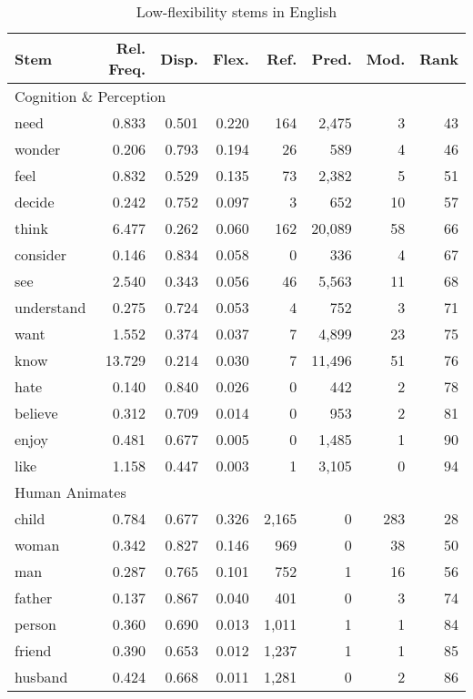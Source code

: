 \begin{table}
  \centering
  \caption{Low-flexibility stems in English}
  \label{tab:English-low-flexibility}
  \begin{tabular}{ l r r r r r r r }
    \toprule
    Stem & Rel. Freq. & Disp. & Flex. & Ref. & Pred. & Mod. & Rank\\

    \midrule
    \multicolumn{6}{l}{Cognition \& Perception}\\
    \midrule
    need       &  0.833 & 0.501 & 0.220 & 164 &  2,475 &  3 & 43\\
    wonder     &  0.206 & 0.793 & 0.194 &  26 &    589 &  4 & 46\\
    feel       &  0.832 & 0.529 & 0.135 &  73 &  2,382 &  5 & 51\\
    decide     &  0.242 & 0.752 & 0.097 &   3 &    652 & 10 & 57\\
    think      &  6.477 & 0.262 & 0.060 & 162 & 20,089 & 58 & 66\\
    consider   &  0.146 & 0.834 & 0.058 &   0 &    336 &  4 & 67\\
    see        &  2.540 & 0.343 & 0.056 &  46 &  5,563 & 11 & 68\\
    understand &  0.275 & 0.724 & 0.053 &   4 &    752 &  3 & 71\\
    want       &  1.552 & 0.374 & 0.037 &   7 &  4,899 & 23 & 75\\
    know       & 13.729 & 0.214 & 0.030 &   7 & 11,496 & 51 & 76\\
    hate       &  0.140 & 0.840 & 0.026 &   0 &    442 &  2 & 78\\
    believe    &  0.312 & 0.709 & 0.014 &   0 &    953 &  2 & 81\\
    enjoy      &  0.481 & 0.677 & 0.005 &   0 &  1,485 &  1 & 90\\
    like       &  1.158 & 0.447 & 0.003 &   1 &  3,105 &  0 & 94\\

    \midrule
    \multicolumn{6}{l}{Human Animates}\\
    \midrule
    child   & 0.784 & 0.677 & 0.326 & 2,165 & 0 & 283 & 28\\
    woman   & 0.342 & 0.827 & 0.146 &   969 & 0 &  38 & 50\\
    man     & 0.287 & 0.765 & 0.101 &   752 & 1 &  16 & 56\\
    father  & 0.137 & 0.867 & 0.040 &   401 & 0 &   3 & 74\\
    person  & 0.360 & 0.690 & 0.013 & 1,011 & 1 &   1 & 84\\
    friend  & 0.390 & 0.653 & 0.012 & 1,237 & 1 &   1 & 85\\
    husband & 0.424 & 0.668 & 0.011 & 1,281 & 0 &   2 & 86\\


\end{tabular}
\end{table}
